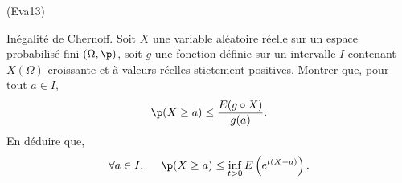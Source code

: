 \begin{tiny}(Eva13)\end{tiny} Inégalité de Chernoff. \newline
Soit $X$ une variable aléatoire réelle sur un espace probabilisé fini $(\Omega,\p)$, soit $g$ une fonction définie sur un intervalle $I$ contenant $X(\Omega)$ croissante et à valeurs réelles stictement positives. Montrer que, pour tout $a\in I$,
\begin{displaymath}
 \p(X \geq a)\leq \frac{E(g\circ X)}{g(a)}.
\end{displaymath}
En déduire que,
\begin{displaymath}
\forall a\in I,\hspace{0.5cm}
 \p(X \geq a)\leq \inf_{t>0}E\left( e^{t(X-a)}\right).
\end{displaymath}
 
